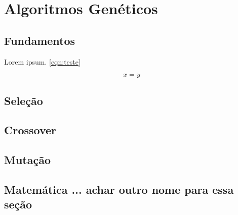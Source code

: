 
\chapter{Algoritmos Genéticos}

\section{Fundamentos}

Lorem ipsum. \autoref{eqn:teste}

\begin{equation}
\label{eqn:teste}
x = y
\end{equation}


\section{Seleção}

\section{Crossover}

\section{Mutação}

\section{Matemática ... achar outro nome para essa seção}